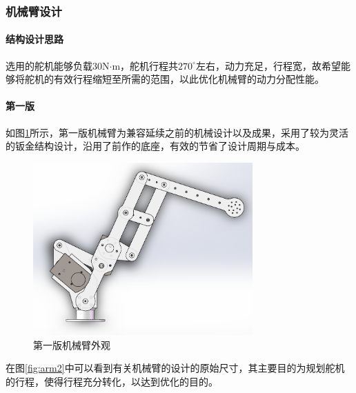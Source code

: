 \subsubsection{机械臂设计}

\paragraph{结构设计思路}

选用的舵机能够负载$30$N$\cdot$m，舵机行程共$270^\circ$左右，动力充足，行程宽，故希望能够将舵机的有效行程缩短至所需的范围，以此优化机械臂的动力分配性能。

\paragraph{第一版}

如图\ref{fig:arm1}所示，第一版机械臂为兼容延续之前的机械设计以及成果，采用了较为灵活的钣金结构设计，沿用了前作的底座，有效的节省了设计周期与成本。

\begin{figure}[H]
    \centering
    \includegraphics[width = 0.75\textwidth]{images/arm_1.png}
    \caption{第一版机械臂外观}
    \label{fig:arm1}
\end{figure}

在图\ref{fig:arm2}中可以看到有关机械臂的设计的原始尺寸，其主要目的为规划舵机的行程，使得行程充分转化，以达到优化的目的。

